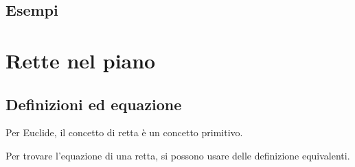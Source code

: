 \documentclass[letterpaper,10pt,english]{jupyterBook}
\begin{document}
\subsection{Esempi}
\label{\detokenize{ch/analytic_geometry/analytic_geometry_2d/curves:esempi}}
\sphinxstepscope


\section{Rette nel piano}
\label{\detokenize{ch/analytic_geometry/analytic_geometry_2d/lines:rette-nel-piano}}\label{\detokenize{ch/analytic_geometry/analytic_geometry_2d/lines:geometry-analytic-2d-lines}}\label{\detokenize{ch/analytic_geometry/analytic_geometry_2d/lines::doc}}

\subsection{Definizioni ed equazione}
\label{\detokenize{ch/analytic_geometry/analytic_geometry_2d/lines:definizioni-ed-equazione}}
\sphinxAtStartPar
Per Euclide, il concetto di retta è un concetto primitivo.



\sphinxAtStartPar
Per trovare l’equazione di una retta, si possono usare delle definizione equivalenti.
\end{document}

